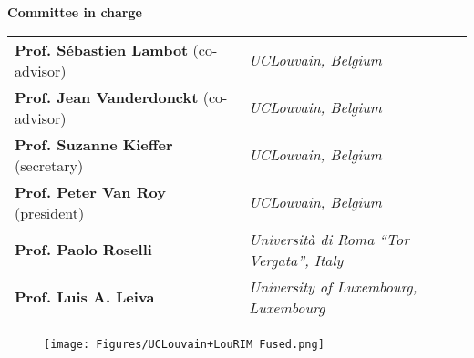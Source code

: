\documentclass[
  10pt, %
  english, %
  singlespacing, %
]{MastersDoctoralThesis} %
\begin{document}
\begin{titlepage}
  \begin{center}
    \small \textbf{Committee in charge}\\[0.2cm]
    \begin{tabular}{ll}
      \textbf{Prof. Sébastien Lambot} (co-advisor) & \textit{UCLouvain, Belgium} \\
      \textbf{Prof. Jean Vanderdonckt} (co-advisor) & \textit{UCLouvain, Belgium} \\
      \textbf{Prof. Suzanne Kieffer} (secretary) & \textit{UCLouvain, Belgium} \\
      \textbf{Prof. Peter Van Roy} (president) & \textit{UCLouvain, Belgium} \\
      \textbf{Prof. Paolo Roselli} & \textit{Università di Roma ``Tor Vergata'', Italy} \\
      \textbf{Prof. Luis A. Leiva} & \textit{University of Luxembourg, Luxembourg} \\
    \end{tabular}  
  \end{center}
  
  \vfill

  \begin{figure}[H]
    \centering
    \texttt{[image: Figures/UCLouvain+LouRIM Fused.png]}
  \end{figure}


  \setlength{\parindent}{\oldparindent}%
\end{titlepage}
  
\thispagestyle{empty} 





\tableofcontents %

\end{document}
